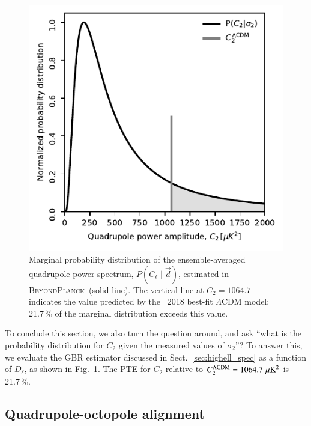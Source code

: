 \documentclass[twocolumn]{aa}
\renewcommand{\d}[0]{\vec{d}}
\newcommand{\BP}{\textsc{BeyondPlanck}}
\begin{document}
\begin{figure}[t]
  \includegraphics[width=\linewidth]{figs/blackwell-rao.pdf}
  \caption{Marginal probability distribution of the ensemble-averaged
    quadrupole power spectrum, $P(C_{\ell}\mid\d)$, estimated in
    \BP\ (solid line). The vertical line at $C_2 = 1064.7$ indicates
    the value predicted by the \Planck\ 2018 best-fit $\Lambda$CDM
    model; 21.7\,\% of the marginal distribution exceeds this value.}
  \label{fig:norm_P_sigma_P_c_2}
\end{figure}

To conclude this section, we also turn the question around, and ask
``what is the probability distribution for $C_2$ given the measured
values of $\sigma_2$''? To answer this, we evaluate the GBR estimator
discussed in Sect.~\ref{sec:highell_spec} as a function of $D_{\ell}$,
as shown in Fig.~\ref{fig:norm_P_sigma_P_c_2}. The PTE for $C_2$
relative to $C_2^{\Lambda \mathrm{CDM}} = 1064.7\,\muK^2$ is 21.7\,\%.



\subsection{Quadrupole-octopole alignment}
\label{sec:alignment}
\end{document}
